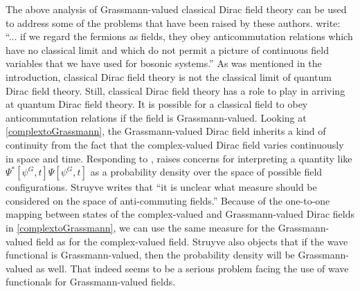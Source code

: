 \documentclass[12pt,secnumarabic,amsmath,amssymb,balancelastpage,nofootinbib]{article}
\begin{document}
The above analysis of Grassmann-valued classical Dirac field theory can be used to address some of the problems that have been raised by these authors.  \citet[pg.\ 374]{bohm1987} write: ``... if we regard the fermions as fields, they obey anticommutation relations which have no classical limit and which do not permit a picture of continuous field variables that we have used for bosonic systems.''  As was mentioned in the introduction, classical Dirac field theory is not the classical limit of quantum Dirac field theory.  Still, classical Dirac field theory has a role to play in arriving at quantum Dirac field theory.  It is possible for a classical field to obey anticommutation relations if the field is Grassmann-valued.  Looking at \eqref{complextoGrassmann}, the Grassmann-valued Dirac field inherits a kind of continuity from the fact that the complex-valued Dirac field varies continuously in space and time.  Responding to \citet{valentini1992, valentini1996}, \citet[sec.\ 9.2.2]{struyve2010} raises concerns for interpreting a quantity like $\Psi^*[\psi^G,t]\Psi[\psi^G,t]$ as a probability density over the space of possible field configurations.  Struyve writes that ``it is unclear what measure should be considered on the space of anti-commuting fields.''  Because of the one-to-one mapping between states of the complex-valued and Grassmann-valued Dirac fields in \eqref{complextoGrassmann}, we can use the same measure for the Grassmann-valued field as for the complex-valued field.  Struyve also objects that if the wave functional is Grassmann-valued, then the probability density will be Grassmann-valued as well.  That indeed seems to be a serious problem facing the use of wave functionals for Grassmann-valued fields.
\end{document}
